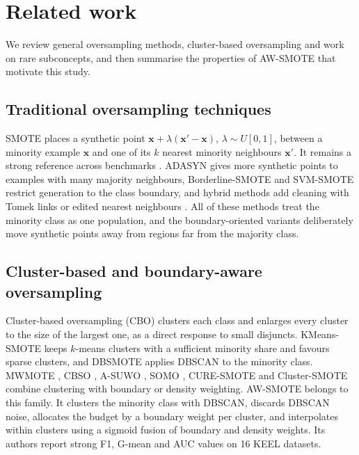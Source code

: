 \documentclass[preprint,nopreprintline]{elsarticle}
\theoremstyle{plain}
\theoremstyle{definition}
\begin{document}
\section{Related work}\label{sec:related}

We review general oversampling methods, cluster-based oversampling and work on rare subconcepts, and then summarise the properties of AW-SMOTE that motivate this study.

\subsection{Traditional oversampling techniques}\label{sec:rw-over}

SMOTE \cite{chawla2002smote} places a synthetic point $\mathbf{x}+\lambda(\mathbf{x}'-\mathbf{x})$, $\lambda\sim U[0,1]$, between a minority example $\mathbf{x}$ and one of its $k$ nearest minority neighbours $\mathbf{x}'$. It remains a strong reference across benchmarks \cite{fernandez2018smote,kovacs2019empirical}. ADASYN \cite{he2008adasyn} gives more synthetic points to examples with many majority neighbours, Borderline-SMOTE \cite{han2005borderline} and SVM-SMOTE \cite{nguyen2011borderline} restrict generation to the class boundary, and hybrid methods add cleaning with Tomek links or edited nearest neighbours \cite{batista2004study,tomek1976two,wilson1972asymptotic}. All of these methods treat the minority class as one population, and the boundary-oriented variants deliberately move synthetic points away from regions far from the majority class.

\subsection{Cluster-based and boundary-aware oversampling}\label{sec:rw-cluster}

Cluster-based oversampling (CBO) \cite{jo2004class} clusters each class and enlarges every cluster to the size of the largest one, as a direct response to small disjuncts. KMeans-SMOTE \cite{douzas2018kmeans} keeps $k$-means clusters with a sufficient minority share and favours sparse clusters, and DBSMOTE \cite{bunkhumpornpat2012dbsmote} applies DBSCAN \cite{ester1996density} to the minority class. MWMOTE \cite{barua2014mwmote}, CBSO \cite{barua2011cbso}, A-SUWO \cite{nekooeimehr2016asuwo}, SOMO \cite{douzas2017somo}, CURE-SMOTE \cite{ma2017cure} and Cluster-SMOTE \cite{cieslak2006combating} combine clustering with boundary or density weighting. AW-SMOTE \cite{yan2026awsmote} belongs to this family. It clusters the minority class with DBSCAN, discards DBSCAN noise, allocates the budget by a boundary weight per cluster, and interpolates within clusters using a sigmoid fusion of boundary and density weights. Its authors report strong F1, G-mean and AUC values on 16 KEEL datasets.
\end{document}
